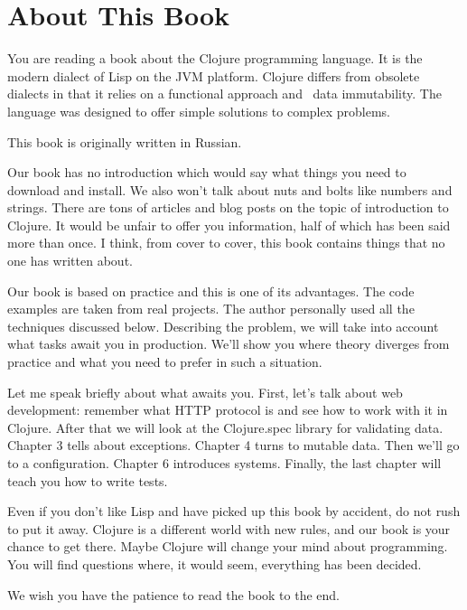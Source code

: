 
\section*{About This Book}

You are reading a book about the Clojure programming language. It is the modern dialect of Lisp on the JVM platform.
Clojure differs from obsolete dialects in that it relies on a functional approach and ~data immutability.
The language was designed to offer simple solutions to complex problems.

This book is originally written in Russian.

Our book has no introduction which would say what things you need to download and install.
We also won't talk about nuts and bolts like numbers and strings.
There are tons of articles and blog posts on the topic of introduction to Clojure.
It would be unfair to offer you information, half of which has been said more than once.
I think, from cover to cover, this book contains things that no one has written about.

Our book is based on practice and this is one of its advantages. The code examples are taken from real projects.
The author personally used all the techniques discussed below. Describing the problem, we will take into account what tasks await you in production.
We'll show you where theory diverges from practice and what you need to prefer in such a situation.

Let me speak briefly about what awaits you. First, let's talk about web development: remember what HTTP protocol is and see how to work with it in Clojure.
After that we will look at the Clojure.spec library for validating data.
Chapter 3 tells about exceptions. Chapter 4 turns to mutable data.
Then we'll go to a configuration. Chapter 6 introduces systems. Finally, the last chapter will teach you how to write tests.

Even if you don't like Lisp and have picked up this book by accident, do not rush to put it away.
Clojure is a different world with new rules, and our book is your chance to get there.
Maybe Clojure will change your mind about programming. You will find questions where, it would seem, everything has been decided.

We wish you have the patience to read the book to the end.

